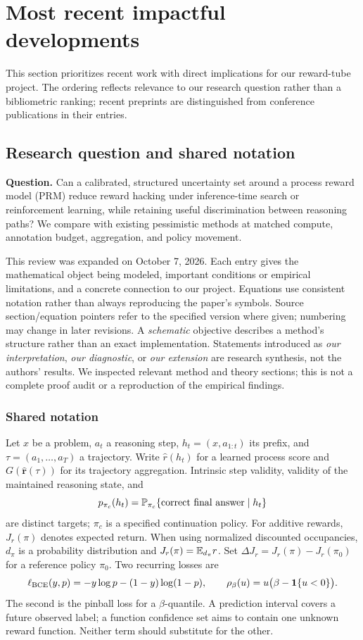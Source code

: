 \section{Most recent impactful developments}
This section prioritizes recent work with direct implications for our reward-tube project.
The ordering reflects relevance to our research question rather than a bibliometric
ranking; recent preprints are distinguished from conference publications in their entries.

\subsection{Research question and shared notation}
\label{sec:review}
\textbf{Question.} Can a calibrated, structured uncertainty set around a process
reward model (PRM) reduce reward hacking under inference-time search or
reinforcement learning, while retaining useful discrimination between reasoning paths?
We compare with existing pessimistic methods at matched compute, annotation budget,
aggregation, and policy movement.

This review was expanded on October 7, 2026. Each entry gives the mathematical
object being modeled, important conditions or empirical limitations, and a concrete
connection to our project. Equations use consistent notation rather than always
reproducing the paper's symbols. Source section/equation pointers refer to the
specified version where given; numbering may change in later revisions. A
\emph{schematic} objective describes a method's structure rather than an exact
implementation. Statements introduced as \emph{our interpretation}, \emph{our
diagnostic}, or \emph{our extension} are research synthesis, not the authors' results.
We inspected relevant method and theory sections; this is not a complete proof audit
or a reproduction of the empirical findings.

\subsubsection{Shared notation}
Let $x$ be a problem, $a_t$ a reasoning step, $h_t=(x,a_{1:t})$ its prefix,
and $\tau=(a_1,\ldots,a_T)$ a trajectory. Write $\hat r(h_t)$ for a learned
process score and $G(\hat{\bm r}(\tau))$ for its trajectory aggregation.
Intrinsic step validity, validity of the maintained reasoning state, and
\[
 p_{\pi_c}(h_t)=\mathbb{P}_{\pi_c}\{\text{correct final answer}\mid h_t\}
\]
are distinct targets; $\pi_c$ is a specified continuation policy. For additive
rewards, $J_r(\pi)$ denotes expected return. When using normalized discounted
occupancies, $d_\pi$ is a probability distribution and $J_r(\pi)=\mathbb{E}_{d_\pi}r$.
Set $\Delta J_r=J_r(\pi)-J_r(\pi_0)$ for a reference policy $\pi_0$.
Two recurring losses are
\[
 \ell_{\rm BCE}(y,p)=-y\log p-(1-y)\log(1-p),\qquad
 \rho_\beta(u)=u\bigl(\beta-\mathbf{1}\{u<0\}\bigr).
\]
The second is the pinball loss for a $\beta$-quantile. A prediction interval
covers a future observed label; a function confidence set aims to contain one
unknown reward function. Neither term should substitute for the other.

